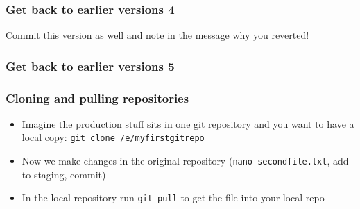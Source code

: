 \documentclass[12pt,english]{beamer}
\begin{document}
\begin{frame}
\frametitle{Get back to earlier versions 4}

\begin{center}
\end{center}

Commit this version as well and note in the message why you reverted!

\end{frame}

\begin{frame}
\frametitle{Get back to earlier versions 5}

\begin{center}
\end{center}

\end{frame}

\begin{frame}
\frametitle{Cloning and pulling repositories}

\begin{itemize}
\item Imagine the production stuff sits in one git repository and you want to have a local copy: \texttt{git clone /e/myfirstgitrepo}
\item Now we make changes in the original repository (\texttt{nano secondfile.txt}, add to staging, commit)
\item In the local repository run \texttt{git pull} to get the file into your local repo
\end{itemize}
\end{frame}
\end{document}
